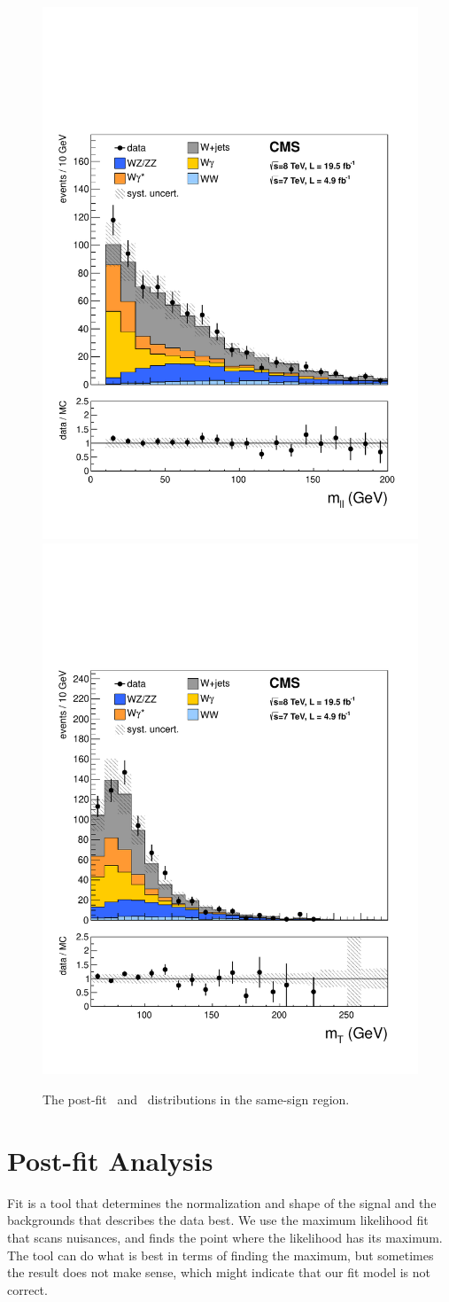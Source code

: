 \begin{figure}[!hbtp] 
\begin{center}
    \includegraphics[width=.47\textwidth]{figures/SS_mll_0j.pdf}
    \includegraphics[width=.47\textwidth]{figures/SS_mT_0j.pdf}
    \caption{The post-fit \mll\ and \mT\ distributions in the same-sign region.} 
    \label{fig:ssCRfit}
\end{center}
\end{figure}



\section{Post-fit Analysis}
\label{sec:postfit-ana}

Fit is a tool that determines the normalization and shape of the 
signal and the backgrounds that describes the data best. 
We use the maximum likelihood fit that scans nuisances, and finds 
the point where the likelihood has its maximum. The tool 
can do what is best in terms of finding the maximum, but 
sometimes the result does not make sense, which might 
indicate that our fit model is not correct. 


